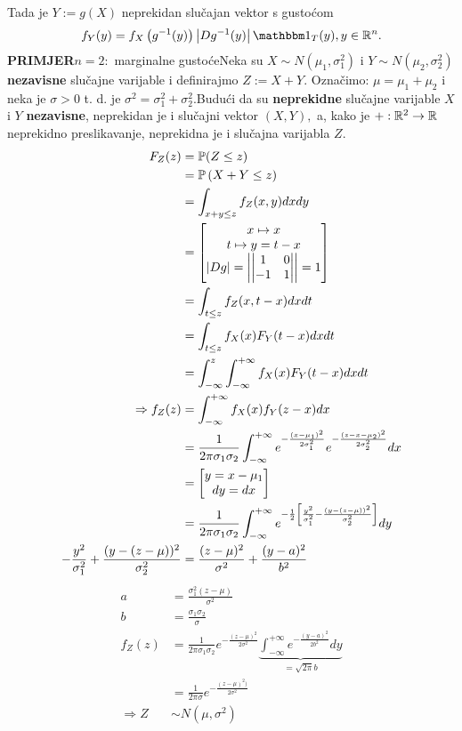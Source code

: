 \documentclass{article}
\begin{document}
Tada je \(Y:=g(X)\) neprekidan slučajan vektor s gustoćom \[f_Y(y)=f_X\left(g^{-1}(y)\right)\left|Dg^{-1}(y)\right|\mathbbm 1_{T}(y),y\in\Bbb R^n.\] 
\textbf{PRIMJER}\newline \(n=2:\) marginalne gustoće\newline Neka su \(X\sim N\left(\mu_1,\sigma_1^2\right)\) i \(Y\sim N\left(\mu_2,\sigma_2^2\right)\) \textbf{nezavisne} slučajne varijable i definirajmo \(Z:=X+Y.\) Označimo: \(\mu=\mu_1+\mu_2\) i neka je \(\sigma>0\) t. d. je \(\sigma^2=\sigma_1^2+\sigma_2^2.\)\newline Budući da su \textbf{neprekidne} slučajne varijable \(X\) i \(Y\) \textbf{nezavisne}, neprekidan je i slučajni vektor \((X,Y),\) a, kako je \(+:\Bbb R^2\to\Bbb R\) neprekidno preslikavanje, neprekidna je i slučajna varijabla \(Z.\) \[\begin{aligned}F_Z(z)&=\Bbb P(Z\le z)\\&=\Bbb P\left(X+Y\le z\right)\\&=\int_{x+y\le z}f_Z(x,y)dxdy\\&=\begin{bmatrix}x\mapsto x\\t\mapsto y=t-x\\|Dg|=\left|\begin{vmatrix}1&0\\-1&1\end{vmatrix}\right|=1\end{bmatrix}\\&=\int_{t\le z}f_Z(x,t-x)dxdt\\&=\int_{t\le z}f_X(x)F_Y(t-x)dxdt\\&=\int_{-\infty}^z\int_{-\infty}^{+\infty}f_X(x)F_Y(t-x)dxdt\\\Rightarrow f_Z(z)&=\int_{-\infty}^{+\infty}f_X(x)f_Y(z-x)dx\\&=\frac1{2\pi\sigma_1\sigma_2}\int_{-\infty}^{+\infty}e^{-\frac{(x-\mu_1)^2}{2\sigma_1^2}}e^{-\frac{(z-x-\mu_2)^2}{2\sigma_2^2}}dx\\&=\begin{bmatrix}y=x-\mu_1\\dy=dx\end{bmatrix}\\&=\frac1{2\pi\sigma_1\sigma_2}\int_{-\infty}^{+\infty}e^{-\frac12\left[\frac{y^2}{\sigma_1^2}-\frac{(y-(z-\mu))^2}{\sigma_2^2}\right]}dy\\-\frac{y^2}{\sigma_1^2}+\frac{(y-(z-\mu))^2}{\sigma_2^2}&=\frac{(z-\mu)^2}{\sigma^2}+\frac{(y-a)^2}{b^2}\end{aligned}\]\[\begin{aligned}a&=\frac{\sigma_1^2(z-\mu)}{\sigma^2}\\b&=\frac{\sigma_1\sigma_2}\sigma\\f_Z(z)&=\frac1{2\pi\sigma_1\sigma_2}e^{-\frac{(z-\mu)^2}{2\sigma^2}}\underbrace{\int_{-\infty}^{+\infty}e^{-\frac{(y-a)^2}{2b^2}}dy}_{=\sqrt{2\pi}b}\\&=\frac1{2\pi\sigma}e^{-\frac{(z-\mu)^2)}{2\sigma^2}}\\\Rightarrow Z&\sim N(\mu,\sigma^2)\end{aligned}\]    
\end{document}
